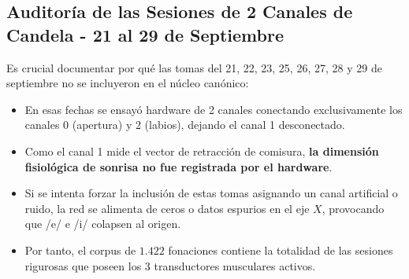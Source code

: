 \documentclass[11pt,a4paper,openany]{book}
\theoremstyle{definition}
\begin{document}
\begin{table}[H]
\centering
\small
{}
\caption{Valores numéricos analíticos de la transformación rígida de Procrustes por sesión.}
\label{tab:valores_analiticos}
\end{table}

\subsection{Auditoría de las Sesiones de 2 Canales de Candela - 21 al 29 de Septiembre}
Es crucial documentar por qué las tomas del 21, 22, 23, 25, 26, 27, 28 y 29 de septiembre no se incluyeron en el núcleo canónico:
\begin{itemize}
    \item En esas fechas se ensayó hardware de 2 canales conectando exclusivamente los canales 0 (apertura) y 2 (labios), dejando el canal 1 desconectado.
    \item Como el canal 1 mide el vector de retracción de comisura, \textbf{la dimensión fisiológica de sonrisa no fue registrada por el hardware}.
    \item Si se intenta forzar la inclusión de estas tomas asignando un canal artificial o ruido, la red se alimenta de ceros o datos espurios en el eje $X$, provocando que /e/ e /i/ colapsen al origen.
    \item Por tanto, el corpus de $1.422$ fonaciones contiene la totalidad de las sesiones rigurosas que poseen los 3 transductores musculares activos.
\end{itemize}
\end{document}
